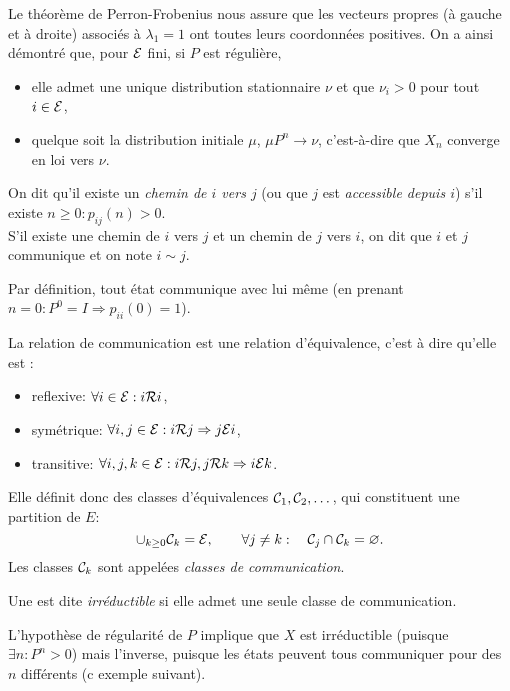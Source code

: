 \remark
Le théorème de Perron-Frobenius nous assure que les vecteurs propres (à gauche et à droite) associés à $\lambda_1 = 1$ ont toutes leurs coordonnées positives. On a ainsi démontré que, pour $\mathcal{E}$ fini, si $P$ est régulière, 
\begin{itemize}
  \item elle admet une unique distribution stationnaire $\nu$ et que $\nu_i > 0$ pour tout $i \in \mathcal{E}$, 
  \item quelque soit la distribution initiale $\mu$, $\mu P^n \rightarrow \nu$, c'est-à-dire que $X_n$ converge en loi vers $\nu$.
\end{itemize}

\begin{definition*}
  On dit qu'il existe un {\em chemin de $i$ vers $j$} (ou que $j$ est {\em accessible depuis $i$}) s'il existe $n \geq 0: p_{ij}(n) > 0$. \\
  S'il existe une chemin de $i$ vers $j$ et un chemin de $j$ vers $i$, on dit que $i$ et $j$ communique et on note $i \sim j$.
\end{definition*}

\remark
Par définition, tout état communique avec lui même (en prenant $n= 0 : P^0 = I \Rightarrow p_{ii}(0) = 1$).

La relation de communication est une relation d'équivalence, c'est à dire qu'elle est :
\begin{itemize}
  \item reflexive: $\forall i \in \mathcal{E}: i \mathcal{R} i$,
  \item symétrique: $\forall i, j \in \mathcal{E}: i \mathcal{R} j \Rightarrow j \mathcal{E} i$,
  \item transitive: $\forall i, j, k \in \mathcal{E}: i \mathcal{R} j, j \mathcal{R} k \Rightarrow i \mathcal{E} k$.
\end{itemize}
Elle définit donc des classes d'équivalences $\mathcal{C}_1, \mathcal{C}_2, \dots $, qui constituent une partition de $E$:
$$
\cup_{k \geq 0} \mathcal{C}_k = \mathcal{E}, \qquad \forall j \neq k: \quad \mathcal{C}_j \cap \mathcal{C}_k = \varnothing.
$$
Les classes $\mathcal{C}_k$ sont appelées {\em classes de communication}.

\begin{definition*}
  Une \cM est dite {\em irréductible} si elle admet une seule classe de communication.
\end{definition*}

\remark
L'hypothèse de régularité de $P$ implique que $X$ est irréductible (puisque $\exists n: P^n > 0$) mais l'inverse, puisque les états peuvent tous communiquer pour des $n$ différents (c exemple suivant).


